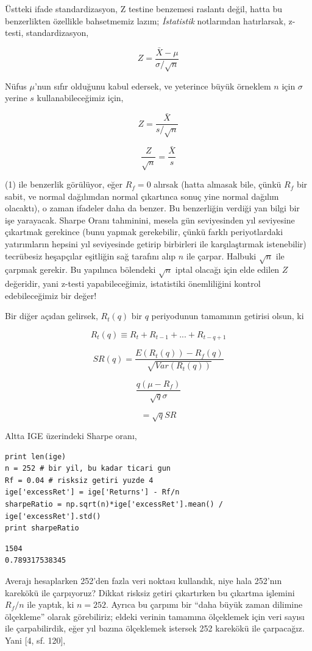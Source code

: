 \documentclass[12pt,fleqn]{article}\usepackage{../../common}
\begin{document}
Üstteki ifade standardizasyon, Z testine benzemesi raslantı değil, hatta bu
benzerlikten özellikle bahsetmemiz lazım; {\em İstatistik} notlarından
hatırlarsak, z-testi, standardizasyon,

$$ Z = \frac{\bar{X} - \mu}{\sigma / \sqrt{n} } $$

Nüfus $\mu$'nun sıfır olduğunu kabul edersek, ve yeterince büyük örneklem
$n$ için $\sigma$ yerine $s$ kullanabileceğimiz için,

$$ Z = \frac{\bar{X}}{s / \sqrt{n} } $$

$$ \frac{Z}{\sqrt{n}} = \frac{\bar{X}}{s} $$

(1) ile benzerlik görülüyor, eğer $R_f=0$ alırsak (hatta almasak bile,
çünkü $R_f$ bir sabit, ve normal dağılımdan normal çıkartınca sonuç yine
normal dağılım olacaktı), o zaman ifadeler daha da benzer. Bu benzerliğin
verdiği yan bilgi bir işe yarayacak. Sharpe Oranı tahminini, mesela gün
seviyesinden yıl seviyesine çıkartmak gerekince (bunu yapmak gerekebilir,
çünkü farklı periyotlardaki yatırımların hepsini yıl seviyesinde getirip
birbirleri ile karşılaştırmak istenebilir) tecrübesiz heşapçılar eşitliğin
sağ tarafını alıp $n$ ile çarpar. Halbuki $\sqrt{n}$ ile çarpmak
gerekir. Bu yapılınca bölendeki $\sqrt{n}$ iptal olacağı için elde edilen
$Z$ değeridir, yani z-testi yapabileceğimiz, istatistiki önemliliğini
kontrol edebileceğimiz bir değer!

Bir diğer açıdan gelirsek,  $R_t(q)$ bir $q$ periyodunun tamamının getirisi
olsun, ki

$$ R_t(q) \equiv R_t + R_{t-1} + ... + R_{t-q+1}  $$

$$ SR(q) = \frac{E(R_t(q)) - R_f(q)}{\sqrt{Var(R_t(q))}} $$

$$ \frac{q(\mu-R_f)}{\sqrt{q} \sigma} $$

$$ = \sqrt{q}SR $$

Altta IGE üzerindeki Sharpe oranı,

\begin{verbatim}
print len(ige)
n = 252 # bir yil, bu kadar ticari gun
Rf = 0.04 # risksiz getiri yuzde 4
ige['excessRet'] = ige['Returns'] - Rf/n
sharpeRatio = np.sqrt(n)*ige['excessRet'].mean() / ige['excessRet'].std()
print sharpeRatio
\end{verbatim}

\begin{verbatim}
1504
0.789317538345
\end{verbatim}

Averajı hesaplarken 252'den fazla veri noktası kullandık, niye hala 252'nın
karekökü ile çarpıyoruz? Dikkat risksiz getiri çıkartırken bu çıkartma
işlemini $R_f/n$ ile yaptık, ki $n=252$. Ayrıca bu çarpımı bir ``daha büyük
zaman dilimine ölçekleme'' olarak görebiliriz; eldeki verinin tamamına
ölçeklemek için veri sayısı ile çarpabilirdik, eğer yıl bazına ölçeklemek
istersek 252 karekökü ile çarpacağız. Yani [4, sf. 120], 
\end{document}
